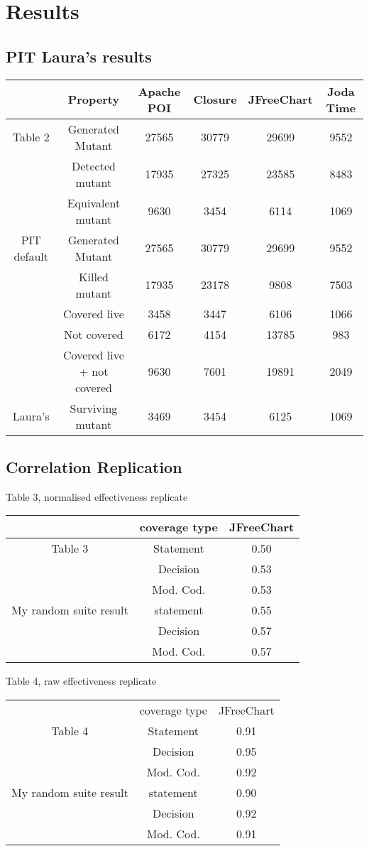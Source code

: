 \section{Results}
\subsection{PIT Laura's results}

\begin{tabular}{|c|c|c|c|c|c|}
	\hline
	&Property & Apache POI & Closure & JFreeChart & Joda Time \\
	\hline
	Table 2 & Generated Mutant & 27565 & 30779 & 29699 & 9552\\
	& Detected mutant & 17935 & 27325 & 23585 & 8483\\
	& Equivalent mutant & 9630 & 3454 & 6114 & 1069\\
	\hline
	PIT default & Generated Mutant & 27565 & 30779 & 29699 & 9552\\
	& Killed mutant & 17935 & 23178 & 9808 & 7503\\
	& Covered live & 3458 & 3447 & 6106 & 1066\\
	& Not covered & 6172 & 4154 & 13785 & 983\\
	& Covered live + not covered & 9630 & 7601 & 19891 & 2049\\
	\hline
	Laura's & Surviving mutant & 3469& 3454& 6125& 1069\\
	\hline
\end{tabular}

\subsection{Correlation Replication}

Table 3, normalised effectiveness replicate

\begin{tabular}{|c|c|c|}
	\hline
	& coverage type & JFreeChart  \\
	\hline
	Table 3 & Statement & 0.50 \\
	& Decision & 0.53  \\
	& Mod. Cod. & 0.53  \\
	\hline
	My random suite result & statement & 0.55 \\
	& Decision & 0.57 \\
	& Mod. Cod. &  0.57 \\
	\hline
\end{tabular}

Table 4, raw effectiveness replicate

\begin{tabular}{|c|c|c|}
	\hline
	& coverage type & JFreeChart \\
	Table 4 & Statement & 0.91  \\
	& Decision & 0.95  \\
	& Mod. Cod. & 0.92  \\
	\hline
	My random suite result & statement & 0.90\\
	& Decision & 0.92 \\
	& Mod. Cod. & 0.91 \\
	\hline
\end{tabular}

